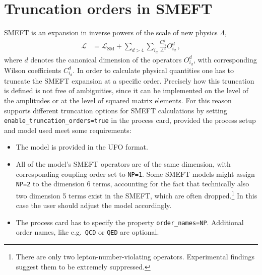 \section{Truncation orders in SMEFT}
\label{sec:SMEFTtruncations}
SMEFT is an expansion in inverse powers of the scale of new physics $\Lambda$,
\begin{align}
   \mathcal{L} &= \mathcal{L}_\mathrm{SM} + \sum_{d>4}\sum_{i_d}\frac{C^d_{i_d}}{\Lambda^d}O^d_{i_d}\,,\label{eq:SMEFTLag}
\end{align}
where $d$ denotes the canonical dimension of the operators $O^d_{i_d}$, with corresponding Wilson coefficients $C^d_{i_d}$. In order to calculate physical quantities one has to truncate the SMEFT expansion at a specific order. Precisely how this truncation is defined is not free of ambiguities, since it can be implemented on the level of the amplitudes or at the level of squared matrix elements. For this reason \gosam supports different truncation options for SMEFT calculations by setting \texttt{enable\_truncation\_orders=true} in the process card, provided the process setup and model used meet some requirements:
\begin{itemize}
   \item The model is provided in the UFO format.
   \item All of the model's SMEFT operators are of the same dimension, with corresponding coupling order set to \texttt{NP=1}. Some SMEFT models might assign \texttt{NP=2} to the dimension 6 terms, accounting for the fact that technically also two dimension 5 terms exist in the SMEFT, which are often dropped.\footnote{There are only two lepton-number-violating operators. Experimental findings suggest them to be extremely suppressed.} In this case the user should adjust the model accordingly.
   \item The \gosam process card has to specify the property \texttt{order\_names=NP}. Additional order names, like e.g.\ \texttt{QCD} or \texttt{QED} are optional.
\end{itemize}

